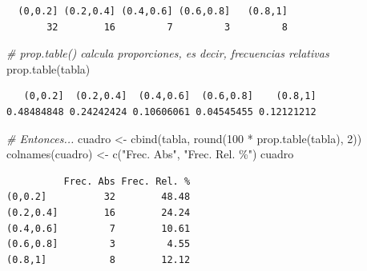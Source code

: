 \documentclass[
]{book}
\newenvironment{Shaded}{\begin{snugshade}}{\end{snugshade}}
\newcommand{\AttributeTok}[1]{\textcolor[rgb]{0.77,0.63,0.00}{#1}}
\newcommand{\CommentTok}[1]{\textcolor[rgb]{0.56,0.35,0.01}{\textit{#1}}}
\newcommand{\DecValTok}[1]{\textcolor[rgb]{0.00,0.00,0.81}{#1}}
\newcommand{\FunctionTok}[1]{\textcolor[rgb]{0.00,0.00,0.00}{#1}}
\newcommand{\NormalTok}[1]{#1}
\newcommand{\OtherTok}[1]{\textcolor[rgb]{0.56,0.35,0.01}{#1}}
\newcommand{\SpecialCharTok}[1]{\textcolor[rgb]{0.00,0.00,0.00}{#1}}
\newcommand{\StringTok}[1]{\textcolor[rgb]{0.31,0.60,0.02}{#1}}
\begin{document}
\begin{verbatim}
  (0,0.2] (0.2,0.4] (0.4,0.6] (0.6,0.8]   (0.8,1] 
       32        16         7         3         8 
\end{verbatim}

\begin{Shaded}
\begin{Highlighting}[]
\CommentTok{\# prop.table() calcula proporciones, es decir, frecuencias relativas}
\FunctionTok{prop.table}\NormalTok{(tabla)}
\end{Highlighting}
\end{Shaded}

\begin{verbatim}
   (0,0.2]  (0.2,0.4]  (0.4,0.6]  (0.6,0.8]    (0.8,1] 
0.48484848 0.24242424 0.10606061 0.04545455 0.12121212 
\end{verbatim}

\begin{Shaded}
\begin{Highlighting}[]
\CommentTok{\# Entonces...}
\NormalTok{cuadro }\OtherTok{\textless{}{-}} \FunctionTok{cbind}\NormalTok{(tabla, }\FunctionTok{round}\NormalTok{(}\DecValTok{100} \SpecialCharTok{*} \FunctionTok{prop.table}\NormalTok{(tabla), }\DecValTok{2}\NormalTok{))}
\FunctionTok{colnames}\NormalTok{(cuadro) }\OtherTok{\textless{}{-}} \FunctionTok{c}\NormalTok{(}\StringTok{"Frec. Abs"}\NormalTok{, }\StringTok{"Frec. Rel. \%"}\NormalTok{)}
\NormalTok{cuadro}
\end{Highlighting}
\end{Shaded}

\begin{verbatim}
          Frec. Abs Frec. Rel. %
(0,0.2]          32        48.48
(0.2,0.4]        16        24.24
(0.4,0.6]         7        10.61
(0.6,0.8]         3         4.55
(0.8,1]           8        12.12
\end{verbatim}

\begin{Shaded}
\end{Shaded}
\end{document}
